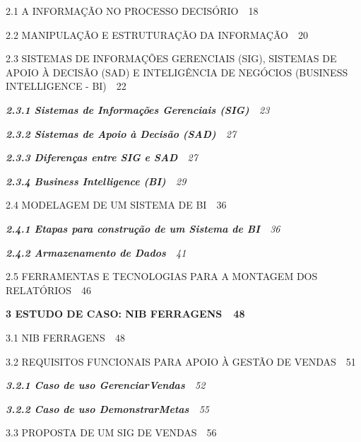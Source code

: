 \documentclass[a4paper]{article}
\newcommand\textstyleTtuloChar[1]{\textsf{\textbf{#1}}}
\begin{document}
{\sffamily\scshape
2.1 A INFORMA\c{C}\~AO NO PROCESSO DECIS\'ORIO\ \ 18}

{\sffamily\scshape
2.2 MANIPULA\c{C}\~AO E ESTRUTURA\c{C}\~AO DA INFORMA\c{C}\~AO\ \ 20}

{\sffamily\scshape
2.3 SISTEMAS DE INFORMA\c{C}\~OES GERENCIAIS (SIG), SISTEMAS DE APOIO \`A DECIS\~AO (SAD) E INTELIG\^ENCIA DE NEG\'OCIOS
(BUSINESS INTELLIGENCE - BI)\ \ 22}

{\sffamily\itshape
\textbf{\textup{2.3.1 Sistemas de Informa\c{c}\~oes Gerenciais (SIG)}}\textup{\ \ 23}}

{\sffamily\itshape
\textbf{\textup{2.3.2 Sistemas de Apoio \`a Decis\~ao (SAD)}}\textup{\ \ 27}}

{\sffamily\itshape
\textbf{\textup{2.3.3 Diferen\c{c}as entre SIG e SAD}}\textup{\ \ 27}}

{\sffamily\itshape
\textbf{\textup{2.3.4 Business Intelligence (BI)}}\textup{\ \ 29}}

{\sffamily\scshape
2.4 MODELAGEM DE UM SISTEMA DE BI\ \ 36}

{\sffamily\itshape
\textbf{\textup{2.4.1 Etapas para constru\c{c}\~ao de um Sistema de BI}}\textup{\ \ 36}}

{\sffamily\itshape
\textbf{\textup{2.4.2 Armazenamento de Dados}}\textup{\ \ 41}}

{\sffamily\scshape
2.5 FERRAMENTAS E TECNOLOGIAS PARA A MONTAGEM DOS RELAT\'ORIOS\ \ 46}

{\sffamily\bfseries
\textstyleTtuloChar{3 ESTUDO DE CASO: NIB FERRAGENS\textmd{\ \ }\foreignlanguage{portuges}{\textmd{48}}}}

{\sffamily\scshape
3.1 NIB FERRAGENS\ \ 48}

{\sffamily\scshape
3.2 REQUISITOS FUNCIONAIS PARA APOIO \`A GEST\~AO DE VENDAS\ \ 51}

{\sffamily\itshape
\textbf{\textup{3.2.1 Caso de uso GerenciarVendas}}\textup{\ \ 52}}

{\sffamily\itshape
\textbf{\textup{3.2.2 Caso de uso DemonstrarMetas}}\textup{\ \ 55}}

{\sffamily\scshape
3.3 PROPOSTA DE UM SIG DE VENDAS\ \ 56}
\end{document}
